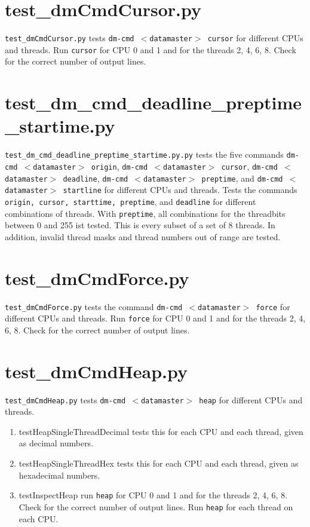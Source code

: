\documentclass[12pt,a4paper]{report}
\begin{document}
\section{test\_dmCmdCursor.py}
\texttt{test\_dmCmdCursor.py} tests \texttt{dm-cmd $<$datamaster$>$ cursor} for different CPUs and threads.
Run \texttt{cursor} for CPU 0 and 1 and for the threads 2, 4, 6, 8.
Check for the correct number of output lines.

\section{test\_dm\_cmd\_deadline\_preptime\_startime.py}
\texttt{test\_dm\_cmd\_deadline\_preptime\_startime.py.py} tests the five commands
\texttt{dm-cmd $<$datamaster$>$ origin},
\texttt{dm-cmd $<$datamaster$>$ cursor},
\texttt{dm-cmd $<$datamaster$>$ deadline},
\texttt{dm-cmd $<$datamaster$>$ preptime}, and
\texttt{dm-cmd $<$datamaster$>$ startline}
for different CPUs and threads.
Tests the commands \texttt{origin, cursor, starttime, preptime}, and
\texttt{deadline} for different combinations  of threads.
With \texttt{preptime}, all combinations for the threadbits between 0
and 255 ist tested. This is every subset of a
set of 8 threads. In addition, invalid thread masks and thread numbers
out of range are tested.

\section{test\_dmCmdForce.py}
\texttt{test\_dmCmdForce.py} tests the command \texttt{dm-cmd
$<$datamaster$>$ force} for different CPUs and threads.
Run \texttt{force} for CPU 0 and 1 and for the threads 2, 4, 6, 8.
Check for the correct number of output lines.

\section{test\_dmCmdHeap.py}
\texttt{test\_dmCmdHeap.py} tests \texttt{dm-cmd $<$datamaster$>$ heap} for different CPUs and threads.
\begin{enumerate}
\item testHeapSingleThreadDecimal tests this for each CPU and each thread, given as decimal numbers.
\item testHeapSingleThreadHex tests this for each CPU and each thread, given as hexadecimal numbers.
\item testInspectHeap run \texttt{heap} for CPU 0 and 1 and for the
threads 2, 4, 6, 8. Check for the correct number of output lines.
Run \texttt{heap} for each thread on each CPU.
\end{enumerate}
\end{document}
